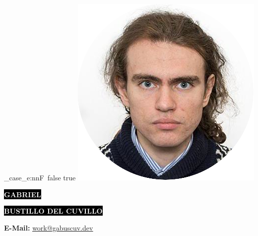 \documentclass[9pt]{developercv} %
\begin{document}

%

\def \photo {false} %


\begin{minipage}[t]{0.45\textwidth} %

	\vspace{-\baselineskip} %
\ExplSyntaxOn

\str_case_e:nnF~{\photo}
{
	{true}{
			  \includegraphics[width=0.4\linewidth]{profile.png}
		}
}
{}%

\ExplSyntaxOff



	\colorbox{black}{{\huge\textcolor{white}{\textbf{\MakeUppercase{Gabriel}}}}} %
	
	\colorbox{black}{{\huge\textcolor{white}{\textbf{\MakeUppercase{Bustillo del Cuvillo}}}}} %
	
	\vspace{6pt}
	
	{\huge \GetTitleLocalized{\langsa}{\jobtype}} %
\end{minipage}
\begin{minipage}[t]{0.233\textwidth} %
	\vspace{-\baselineskip} %
	
	\GetLocationLocalized{\langsa}
	\textbf{E-Mail: }{\href{mailto:work@gabuscuv.dev}{\color{blue}\underline{work@gabuscuv.dev}}}\\	
\end{minipage}
\end{document}
